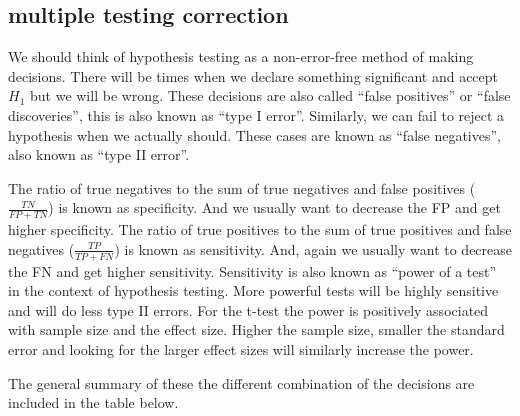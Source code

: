 \documentclass[12pt,]{krantz}
\theoremstyle{definition}
\theoremstyle{definition}
\theoremstyle{definition}
\theoremstyle{remark}
\begin{document}
\hypertarget{multiple-testing-correction}{%
\subsection{multiple testing
correction}\label{multiple-testing-correction}}

We should think of hypothesis testing as a non-error-free method of
making decisions. There will be times when we declare something
significant and accept \(H_1\) but we will be wrong. These decisions are
also called ``false positives'' or ``false discoveries'', this is also
known as ``type I error''. Similarly, we can fail to reject a hypothesis
when we actually should. These cases are known as ``false negatives'',
also known as ``type II error''.

The ratio of true negatives to the sum of true negatives and false
positives (\(\frac{TN}{FP+TN}\)) is known as specificity. And we usually
want to decrease the FP and get higher specificity. The ratio of true
positives to the sum of true positives and false negatives
(\(\frac{TP}{TP+FN}\)) is known as sensitivity. And, again we usually
want to decrease the FN and get higher sensitivity. Sensitivity is also
known as ``power of a test'' in the context of hypothesis testing. More
powerful tests will be highly sensitive and will do less type II errors.
For the t-test the power is positively associated with sample size and
the effect size. Higher the sample size, smaller the standard error and
looking for the larger effect sizes will similarly increase the power.

The general summary of these the different combination of the decisions
are included in the table below.
\end{document}
